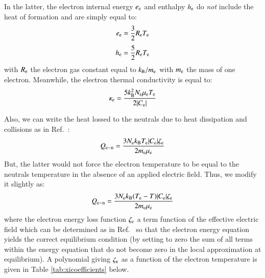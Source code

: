 \documentclass{warpdoc}
\begin{document}
%  
In the latter, the electron internal energy $e_{\rm e}$ and enthalpy $h_{\rm e}$ do \emph{not} include the heat of formation and are simply equal to:
%
\begin{equation}
  e_{\rm e}=\frac{3}{2} R_{\rm e} T_{\rm e}
\end{equation}
%
%
\begin{equation}
  h_{\rm e}=\frac{5}{2} R_{\rm e} T_{\rm e}
\end{equation}
%
with $R_{\rm e}$ the electron gas constant equal to $k_{\rm B}/m_{\rm e}$ with $m_{\rm e}$ the mass of one electron. Meanwhile, the electron thermal conductivity is equal to:
%
\begin{equation}
\kappa_{\rm e} = \frac{5 k_{\rm B}^2 N_{\rm e} \mu_{\rm e} T_{\rm e}}{2 |C_{\rm e}|} 
\end{equation}
%

Also, we can write the heat lossed to the neutrals due to heat dissipation and collisions as in Ref.\ \cite[page 34]{book:1991:raizer}:
%
\begin{equation}
  Q_{\rm e-n} = \frac{3 N_{\rm e} k_{\rm B} T_{\rm e}  |C_{\rm e}| \zeta_{\rm e}}{2 m_{\rm e}\mu_{\rm e}}
\end{equation}
%
But, the latter would not force the electron temperature to be equal to the neutrals temperature in the absence of an applied electric field. Thus, we modify it slightly as:
%
\begin{equation}
  Q_{\rm e-n} = \frac{3 N_{\rm e} k_{\rm B} (T_{\rm e}-T)  |C_{\rm e}| \zeta_{\rm e}}{2 m_{\rm e}\mu_{\rm e}}
\label{eqn:Qen}
\end{equation}
%
where  the electron energy loss function $\zeta_{\rm e}$ a term function of the effective electric field which can be determined as in Ref.\ \cite{misc:1995:boeuf} so that the electron energy equation yields the correct equilibrium condition (by setting to zero the sum of  all terms within the energy equation that do not become zero in the local approximation at equilibrium). A polynomial giving $\zeta_{\rm e}$ as a function of the electron temperature is given in Table \ref{tab:xicoefficients} below. 
\end{document}
